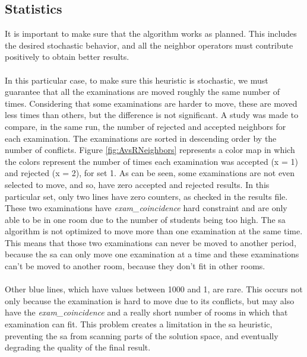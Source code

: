 \subsection{Statistics}
\label{sub:SAStatistics}
It is important to make sure that the algorithm works as planned. This includes the desired stochastic behavior, and all the neighbor operators must contribute positively to obtain better results.\\
\\
In this particular case, to make sure this heuristic is stochastic, we must guarantee that all the examinations are moved roughly the same number of times. Considering that some examinations are harder to move, these are moved less times than others, but the difference is not significant. A study was made to compare, in the same run, the number of rejected and accepted neighbors for each examination. The examinations are sorted in descending order by the number of conflicts. Figure \ref{fig:AvsRNeighbors} represents a color map in which the colors represent the number of times each examination was accepted (x = 1) and rejected (x = 2), for set 1. As can be seen, some examinations are not even selected to move, and so, have zero accepted and rejected results. In this particular set, only two lines have zero counters, as checked in the results file. These two examinations have \textit{exam\_coincidence} hard constraint and are only able to be in one room due to the number of students being too high. The \gls{sa} algorithm is not optimized to move more than one examination at the same time. This means that those two examinations can never be moved to another period, because the \gls{sa} can only move one examination at a time and these examinations can't be moved to another room, because they don't fit in other rooms.\\
\\
Other blue lines, which have values between 1000 and 1, are rare. This occurs not only because the examination is hard to move due to its conflicts, but may also have the \textit{exam\_coincidence} and a really short number of rooms in which that examination can fit. This problem creates a limitation in the \gls{sa} heuristic, preventing the \gls{sa} from scanning parts of the solution space, and eventually degrading the quality of the final result.\\
\\
